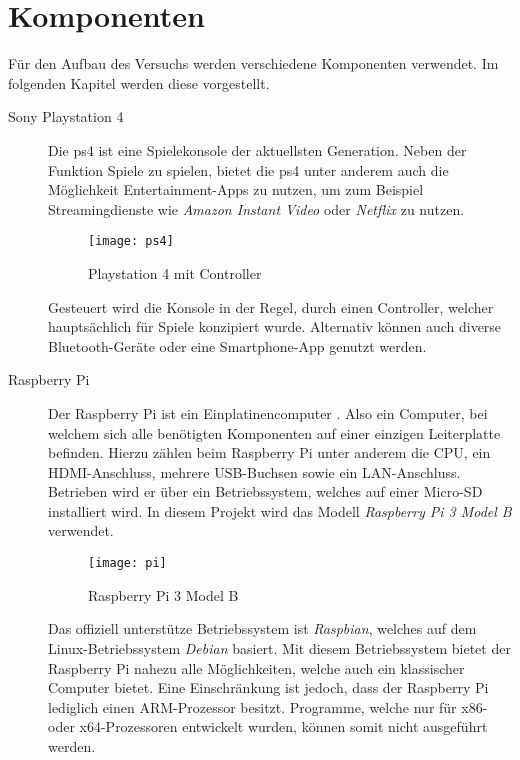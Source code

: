 \newpage
\section{Komponenten}\label{sec:komponenten}
Für den Aufbau des Versuchs werden verschiedene Komponenten verwendet.
Im folgenden Kapitel werden diese vorgestellt.

\begin{description}
    \item[Sony Playstation 4 \cite{PS4Welco38:online}]
        Die \ac{ps4} ist eine Spielekonsole der aktuellsten Generation.
        Neben der Funktion Spiele zu spielen, bietet die \ac{ps4}
        unter anderem auch die Möglichkeit Entertainment-Apps zu nutzen,
        um zum Beispiel Streamingdienste wie \textit{Amazon Instant Video}
        oder \textit{Netflix} zu nutzen.

        \begin{figure}[h!]
            \centering
            \texttt{[image: ps4]}
            \caption{Playstation 4 mit Controller}\label{fig:ps4}
        \end{figure}

        Gesteuert wird die Konsole in der Regel, durch einen Controller,
        welcher hauptsächlich für Spiele konzipiert wurde.
        Alternativ können auch diverse Bluetooth-Geräte oder eine Smartphone-App genutzt werden.

    \newpage

    \item[Raspberry Pi \cite{Whatisth47:online}]
        Der Raspberry Pi ist ein Einplatinencomputer \cite{Einplati37:online}.
        Also ein Computer,
        bei welchem sich alle benötigten Komponenten auf einer einzigen Leiterplatte befinden.
        Hierzu zählen beim Raspberry Pi unter anderem die CPU, ein HDMI-Anschluss, mehrere USB-Buchsen sowie ein LAN-Anschluss.
        Betrieben wird er über ein Betriebssystem, welches auf einer Micro-SD installiert wird.
        In diesem Projekt wird das Modell \textit{Raspberry Pi 3 Model B} verwendet.

        \begin{figure}[h!]
            \centering
            \texttt{[image: pi]}
            \caption{Raspberry Pi 3 Model B \cite{Raspberr2:online}}\label{fig:pi}
        \end{figure}

        Das offiziell unterstütze Betriebssystem ist \textit{Raspbian},
        welches auf dem Linux-Betriebssystem \textit{Debian} basiert.
        Mit diesem Betriebssystem bietet der Raspberry Pi nahezu alle Möglichkeiten,
        welche auch ein klassischer Computer bietet.
        Eine Einschränkung ist jedoch, dass der Raspberry Pi lediglich einen ARM-Prozessor besitzt.
        Programme, welche nur für x86- oder x64-Prozessoren entwickelt wurden,
        können somit nicht ausgeführt werden.


\end{description}

